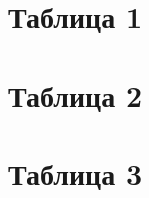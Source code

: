 \documentclass[a4paper,12pt]{article}
\begin{document}
	\section{Таблица 1}
	\section{Таблица 2}

	\section{Таблица 3}
\end{document}
